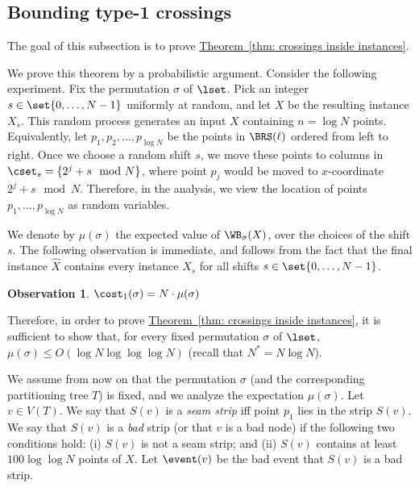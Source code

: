 \documentclass[11pt]{article}
\numberwithin{equation}{section}
\theoremstyle{definition}
\theoremstyle{plain}
\newcommand{\expref}[2]{\hyperref[#2]{#1~\ref{#2}}}
\newtheorem{myobs}[theorem]{Observation}
\begin{document}
%


%

%

%

%

%

%

%
%

%

%
%


%
%
%
\subsection{Bounding type-1 crossings}\label{subsec: type 1 crossings}

%
%
%

The goal of this subsection is to prove \expref{Theorem}{thm: crossings inside instances}.

%
%
%


We prove this theorem by a probabilistic argument. 
Consider the following experiment. 
Fix the permutation $\sigma$ of $\lset$.  
%
Pick an integer $s \in \set{0,\ldots, N-1}$ uniformly at random, and let $X$ be the resulting instance $X_s$. 
This random process generates an input $X$ containing $n = \log N$ points.
Equivalently, let $p_1, p_2, \ldots, p_{\log N}$ be the points in $\BRS(\ell)$ ordered from left to right.  
Once we choose a random shift $s$, we move these points  to columns in $\cset_s = \{2^j + s \mod N \}$, where point $p_j$ would be moved to $x$-coordinate $2^j + s \mod N$. 
Therefore, in the analysis, we view the location of points $p_1,\ldots, p_{\log N}$ as random variables.
  
We denote by $\mu(\sigma)$ the expected value of $\WB_{\sigma}(X)$, over the choices of the shift $s$. The following observation is immediate, and follows from the fact that the final instance $\hat X$ contains every instance $X_s$ for all shifts $s\in \set{0,\ldots,N-1}$.

\begin{myobs}
$\cost_1(\sigma) = N \cdot \mu(\sigma)$ 
\end{myobs}  
%

Therefore, in order to prove \expref{Theorem}{thm: crossings inside instances}, it is sufficient to show that, for every fixed permutation $\sigma$ of $\lset$, $\mu(\sigma)\leq  O(\log N\log\log\log N)$ (recall that $N^*=N\log N$).

%
%


We assume from now on that the permutation $\sigma$ (and the corresponding partitioning tree $T$) is fixed, and we analyze the expectation $\mu(\sigma)$.
Let $v \in V(T)$. We say that $S(v)$ is a \emph{seam strip} iff point $p_1$ lies in the strip $S(v)$. 
We say that $S(v)$ is a \emph{bad} strip (or that $v$ is a bad node) if the following two conditions hold: (i) $S(v)$ is not a seam strip; and (ii) $S(v)$ contains at least $100\log\log N$ points of $X$. 
Let $\event(v)$ be the bad event that $S(v)$ is a bad strip.
  
\end{document}
